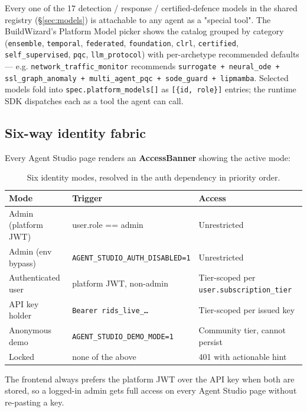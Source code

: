 \documentclass[11pt,a4paper]{article}
\begin{document}
Every one of the 17 detection / response / certified-defence models
in the shared registry (\S\ref{sec:models}) is attachable to any
agent as a "special tool". The BuildWizard's Platform Model picker
shows the catalog grouped by category (\texttt{ensemble},
\texttt{temporal}, \texttt{federated}, \texttt{foundation},
\texttt{clrl}, \texttt{certified}, \texttt{self\_supervised},
\texttt{pqc}, \texttt{llm\_protocol}) with per-archetype recommended
defaults --- e.g. \texttt{network\_traffic\_monitor} recommends
\texttt{surrogate + neural\_ode + ssl\_graph\_anomaly +
multi\_agent\_pqc + sode\_guard + lipmamba}. Selected models fold
into \texttt{spec.platform\_models[]} as \texttt{[\{id, role\}]}
entries; the runtime SDK dispatches each as a tool the agent can
call.

\subsection{Six-way identity fabric}

Every Agent Studio page renders an \textbf{AccessBanner} showing the
active mode:

\begin{table}[H]\centering
\small
\begin{tabular}{@{}lll@{}}
\toprule
Mode & Trigger & Access \\
\midrule
Admin (platform JWT)  & user.role == admin  & Unrestricted \\
Admin (env bypass)    & \texttt{AGENT\_STUDIO\_AUTH\_DISABLED=1} & Unrestricted \\
Authenticated user    & platform JWT, non-admin & Tier-scoped per \texttt{user.subscription\_tier} \\
API key holder        & \texttt{Bearer rids\_live\_\ldots} & Tier-scoped per issued key \\
Anonymous demo        & \texttt{AGENT\_STUDIO\_DEMO\_MODE=1} & Community tier, cannot persist \\
Locked                & none of the above   & 401 with actionable hint \\
\bottomrule
\end{tabular}
\caption{Six identity modes, resolved in the auth dependency in
priority order.}
\end{table}

The frontend always prefers the platform JWT over the API key when
both are stored, so a logged-in admin gets full access on every
Agent Studio page without re-pasting a key.
\end{document}
